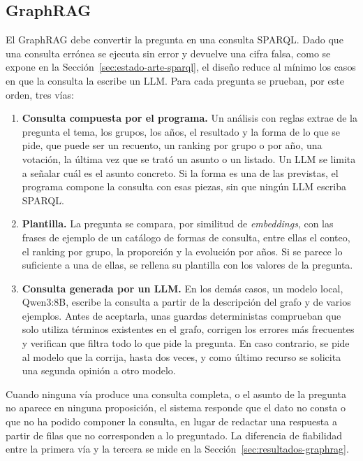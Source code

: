 \documentclass[11pt, a4paper]{report}
\begin{document}
	\subsection{GraphRAG}

	El GraphRAG debe convertir la pregunta en una consulta SPARQL. Dado que una
	consulta errónea se ejecuta sin error y devuelve una cifra falsa, como se
	expone en la Sección~\ref{sec:estado-arte-sparql}, el diseño reduce al mínimo
	los casos en que la consulta la escribe un LLM. Para cada pregunta se prueban,
	por este orden, tres vías:

	\begin{enumerate}
		\item \textbf{Consulta compuesta por el programa.} Un análisis con reglas
		extrae de la pregunta el tema, los grupos, los años, el resultado y la
		forma de lo que se pide, que puede ser un recuento, un ranking por grupo o
		por año, una votación, la última vez que se trató un asunto o un listado.
		Un LLM se limita a señalar cuál es el asunto concreto. Si la forma es una
		de las previstas, el programa compone la consulta con esas piezas, sin que
		ningún LLM escriba SPARQL.
		\item \textbf{Plantilla.} La pregunta se compara, por similitud de
		\textit{embeddings}, con las frases de ejemplo de un catálogo de formas de
		consulta, entre ellas el conteo, el ranking por grupo, la proporción y la
		evolución por años. Si se parece lo suficiente a una de ellas, se rellena
		su plantilla con los valores de la pregunta.
		\item \textbf{Consulta generada por un LLM.} En los demás casos, un modelo
		local, Qwen3:8B, escribe la consulta a partir de la descripción del grafo
		y de varios ejemplos. Antes de aceptarla, unas guardas deterministas
		comprueban que solo utiliza términos existentes en el grafo, corrigen los
		errores más frecuentes y verifican que filtra todo lo que pide la
		pregunta. En caso contrario, se pide al modelo que la corrija, hasta dos
		veces, y como último recurso se solicita una segunda opinión a otro
		modelo.
	\end{enumerate}

	Cuando ninguna vía produce una consulta completa, o el asunto de la pregunta
	no aparece en ninguna proposición, el sistema responde que el dato no consta o
	que no ha podido componer la consulta, en lugar de redactar una respuesta a
	partir de filas que no corresponden a lo preguntado. La diferencia de
	fiabilidad entre la primera vía y la tercera se mide en la
	Sección~\ref{sec:resultados-graphrag}.
\end{document}
